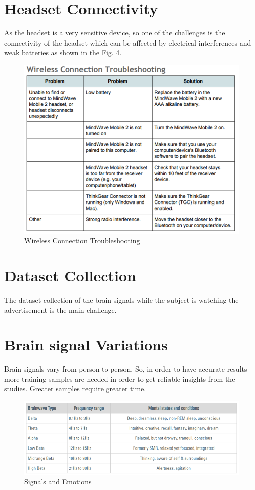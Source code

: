 \documentclass[a4paper, 12pt, oneside]{uet_thesis}
\begin{document}
\section{Headset Connectivity}
As the headset is a very sensitive device, so one of the challenges is the connectivity of the headset which can be affected by electrical interferences and weak batteries as shown in the Fig. 4\cite{b31}.

\begin{figure}[htbp]
\centerline{\includegraphics[scale=0.7]{Table1.png}}
\caption{Wireless Connection Troubleshooting}
\label{Table1}
\end{figure}

\section{Dataset Collection}
The dataset collection of the brain signals while the subject is watching the advertisement is the main challenge.

\section{Brain signal Variations}
Brain signals vary from person to person. So, in order to have accurate results more training samples are needed in order to get reliable insights from the studies. Greater samples require greater time\cite{b32}.

\begin{figure}[htbp]
\centerline{\includegraphics[scale=0.7]{Table2.png}}
\caption{Signals and Emotions}
\label{Table2}
\end{figure}
\end{document}
